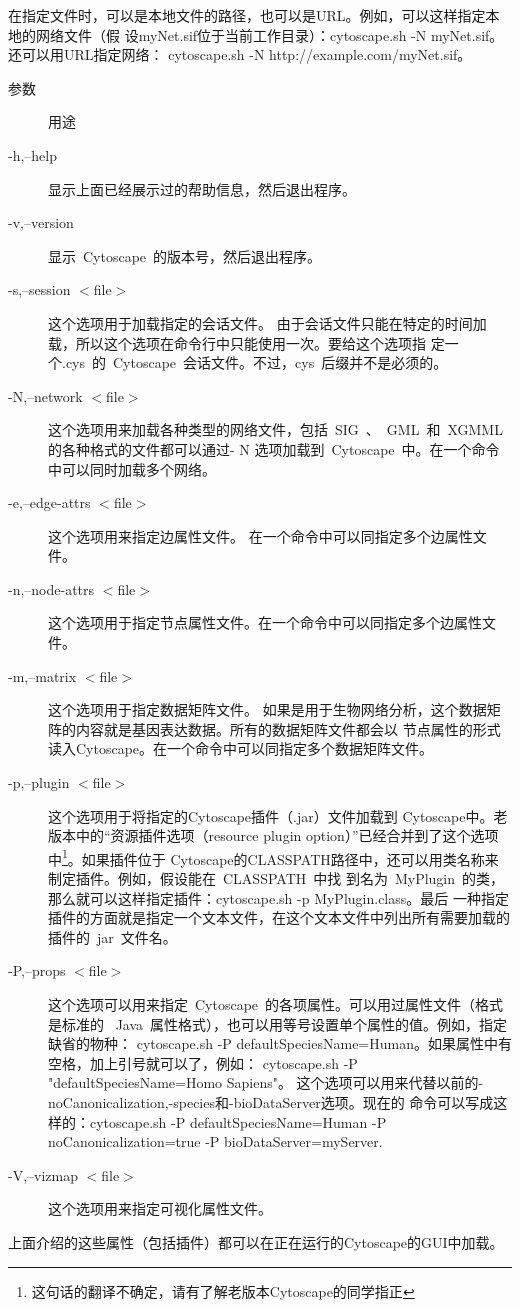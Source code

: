 在指定文件时，可以是本地文件的路径，也可以是URL。例如，可以这样指定本地的网络文件（假
设myNet.sif位于当前工作目录）：cytoscape.sh -N myNet.sif。还可以用URL指定网络：
cytoscape.sh -N http://example.com/myNet.sif。
\begin{description}
\item[参数] 用途
\item[-h,--help] 显示上面已经展示过的帮助信息，然后退出程序。
\item[-v,--version] 显示~Cytoscape~的版本号，然后退出程序。

\item[-s,--session $<$file$>$] 这个选项用于加载指定的会话文件。
由于会话文件只能在特定的时间加载，所以这个选项在命令行中只能使用一次。要给这个选项指
定一个.cys~的~Cytoscape~会话文件。不过，cys~后缀并不是必须的。
\item[-N,--network $<$file$>$]
这个选项用来加载各种类型的网络文件，包括~SIG~、~GML~和~XGMML的各种格式的文件都可以通过- N
选项加载到~Cytoscape~中。在一个命令中可以同时加载多个网络。
\item[-e,--edge-attrs $<$file$>$] 这个选项用来指定边属性文件。
在一个命令中可以同指定多个边属性文件。
\item[-n,--node-attrs $<$file$>$] 这个选项用于指定节点属性文件。在一个命令中可以同指定多个边属性文件。
\item[-m,--matrix $<$file$>$]这个选项用于指定数据矩阵文件。
如果是用于生物网络分析，这个数据矩阵的内容就是基因表达数据。所有的数据矩阵文件都会以
节点属性的形式读入Cytoscape。在一个命令中可以同指定多个数据矩阵文件。
\item[-p,--plugin $<$file$>$]这个选项用于将指定的Cytoscape插件（.jar）文件加载到
Cytoscape中。老版本中的“资源插件选项（resource plugin option）”已经合并到了这个选项
中\footnote{这句话的翻译不确定，请有了解老版本Cytoscape的同学指正}。如果插件位于
Cytoscape的CLASSPATH路径中，还可以用类名称来制定插件。例如，假设能在~CLASSPATH~中找
到名为~MyPlugin~的类，那么就可以这样指定插件：cytoscape.sh -p MyPlugin.class。最后
一种指定插件的方面就是指定一个文本文件，在这个文本文件中列出所有需要加载的插件的~jar~文件名。 
\item[-P,--props
$<$file$>$]这个选项可以用来指定~Cytoscape~的各项属性。可以用过属性文件（格式是标准的
~Java~属性格式），也可以用等号设置单个属性的值。例如，指定缺省的物种：
cytoscape.sh -P defaultSpeciesName=Human。如果属性中有空格，加上引号就可以了，例如：
cytoscape.sh -P "defaultSpeciesName=Homo Sapiens"。
这个选项可以用来代替以前的-noCanonicalization,-species和-bioDataServer选项。现在的
命令可以写成这样的：cytoscape.sh -P defaultSpeciesName=Human -P noCanonicalization=true
-P bioDataServer=myServer.
\item[-V,--vizmap $<$file$>$] 这个选项用来指定可视化属性文件。
\end{description}

上面介绍的这些属性（包括插件）都可以在正在运行的Cytoscape的GUI中加载。